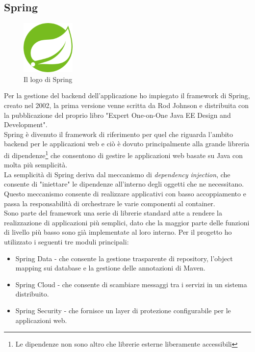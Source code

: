 \subsection{Spring}
\begin{figure}[h]
    \centering
    \includegraphics[width=100px]{./images/spring_logo.png}
    \caption{Il logo di Spring}
    \label{fig:Spring}
\end{figure}
Per la gestione del backend dell'applicazione ho impiegato il framework di Spring, creato nel 2002, la prima versione venne scritta da Rod Johnson e distribuita con la pubblicazione del proprio libro "Expert One-on-One Java EE Design and Development"\cite{SpringHistory}.
\\
Spring è divenuto il framework di riferimento per quel che riguarda l'ambito backend per le applicazioni web e ciò è dovuto principalmente alla grande libreria di dipendenze\footnote{Le dipendenze non sono altro che librerie esterne liberamente accessibili} che consentono di gestire le applicazioni web basate su Java con molta più semplicità.
\\
La semplicità di Spring deriva dal meccanismo di \emph{dependency injection}, che consente di "iniettare" le dipendenze all'interno degli oggetti che ne necessitano. Questo meccanismo consente di realizzare applicativi con basso accoppiamento e passa la responsabilità di orchestrare le varie componenti al container.\cite{DependencyInjection}
\\
Sono parte del framework una serie di librerie standard atte a rendere la realizzazione di applicazioni più semplici, dato che la maggior parte delle funzioni di livello più basso sono già implementate al loro interno. Per il progetto ho utilizzato i seguenti tre moduli principali:
\begin{itemize}
    \item Spring Data - che consente la gestione trasparente di repository, l'object mapping sui database e la gestione delle annotazioni di Maven. \cite{SpringData}
    \item Spring Cloud - che consente di scambiare messaggi tra i servizi in un sistema distribuito. \cite{SpringCloud}
    \item Spring Security - che fornisce un layer di protezione configurabile per le applicazioni web. \cite{SpringSecurity}
\end{itemize}

